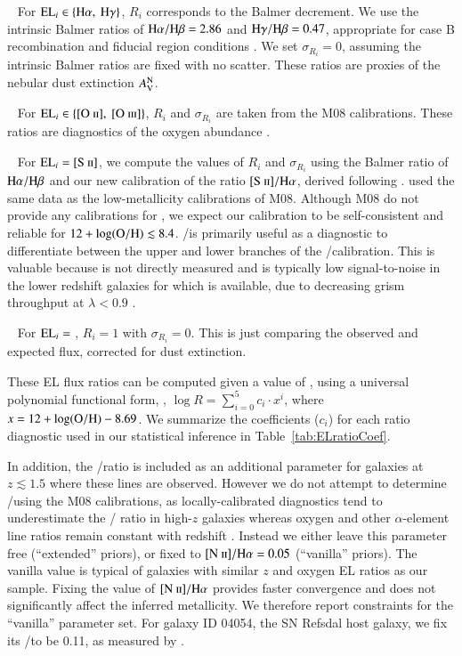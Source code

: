 \indent\textbullet~ For $\textrm{EL}_{i} \in \{\textrm{H}\alpha,~\textrm{H}\gamma\}$, $R_i$ corresponds to the Balmer decrement. We use the intrinsic Balmer ratios 
of $\textrm{H}\alpha/\textrm{H}\beta=2.86$ and $\textrm{H}\gamma/\textrm{H}\beta=0.47$, appropriate for case B recombination and fiducial \HII region conditions \citep[see, 
\eg,][]{Hummer:1987ed}. We set $\sigma_{R_i}=0$, assuming the intrinsic Balmer ratios are fixed with no scatter.
These ratios are proxies of the nebular dust extinction $A_{\rm V}^{\rm N}$.

\indent\textbullet~ For $\textrm{EL}_{i} \in \{[\textrm{O}~\textsc{ii}],~[\textrm{O}~\textsc{iii}]\}$, $R_i$ and $\sigma_{R_i}$ are taken from the M08 calibrations.
These ratios are diagnostics of the oxygen abundance \oh.

\indent\textbullet~ For $\textrm{EL}_{i} = [\textrm{S}~\textsc{ii}]$, we compute the values of $R_i$ and $\sigma_{R_i}$ using the Balmer ratio of $\textrm{H}\alpha/\textrm{H}\beta$ and 
our new calibration of the ratio $[\textrm{S}~\textsc{ii}]/\textrm{H}\alpha$, derived following \citet{2015ApJ...813..126J}. \citet{2015ApJ...813..126J} used the 
same data as the low-metallicity calibrations of M08.
Although M08 do not provide any calibrations for \SII, we expect our calibration to be self-consistent and reliable for
$12+\log({\rm O/H})\lesssim8.4$. \SII/\Ha is primarily useful as a diagnostic to differentiate between the
upper and lower branches of the \OIII/\Hb calibration. This is valuable because \NII is not
directly measured and \OII is typically low signal-to-noise in the lower redshift galaxies
for which \SII is available, due to decreasing grism throughput at $\lambda<0.9$ \micron.

\indent\textbullet~ For $\textrm{EL}_{i} =$ \Hb, $R_i = 1$ with $\sigma_{R_i}=0$. This is just comparing the observed and expected \Hb 
flux, corrected for dust extinction.

\noindent
These EL flux ratios can be computed given a value of \oh, using a universal polynomial functional form, \ie, $\log{R} = 
\sum_{i=0}^{5}c_i\cdot x^i$, where $x=12+\log({\rm O/H})-8.69$.
We summarize the coefficients ($c_i$) for each ratio diagnostic used in our statistical inference in Table~\ref{tab:ELratioCoef}.

In addition, the \NII/\Ha ratio is included as an additional parameter for galaxies at
$z\lesssim1.5$ where these lines are observed. However we do not attempt to determine \NII/\Ha using
the M08 calibrations, as locally-calibrated diagnostics tend to underestimate the \NII/\Ha
ratio in high-$z$ galaxies whereas oxygen and other $\alpha$-element line ratios remain
constant with redshift \citep{2014ApJ...795..165S,2015ApJ...801...88S,2015ApJ...813..126J}.
Instead we either leave this parameter free (``extended'' priors), or fixed to $[\textrm{N}~\textsc{ii}]/\textrm{H}\alpha=0.05$
(``vanilla'' priors).  The vanilla value is typical of galaxies with
similar $z$ and oxygen EL ratios as our sample.  Fixing the value of $[\textrm{N}~\textsc{ii}]/\textrm{H}\alpha$ provides
faster convergence and does not significantly affect the inferred metallicity.  We therefore
report constraints for the ``vanilla'' parameter set. For galaxy ID 04054, the
SN Refsdal host galaxy, we fix its \NII/\Ha to be 0.11, as measured by \citet{Yuan:2011hj}.

